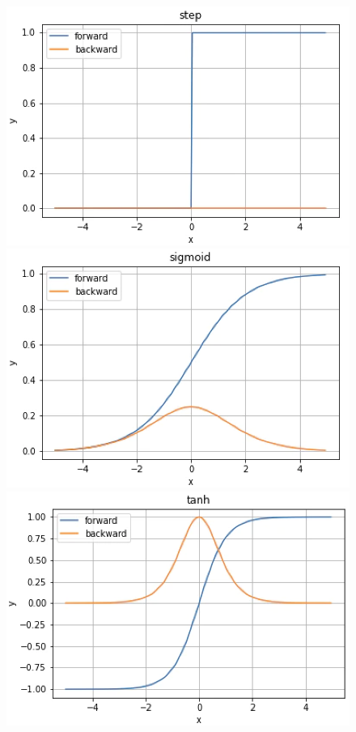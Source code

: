 \begin{figure}[H]
  \begin{minipage}[b]{0.45\linewidth}
    \centering
    \includegraphics[keepaspectratio, scale=0.25]{Figure/Deeplearning/step.png}
  \end{minipage}
    \begin{minipage}[b]{0.45\linewidth}
    \centering
    \includegraphics[keepaspectratio, scale=0.25]{Figure/Deeplearning/sigmoid.png}
  \end{minipage}
  \begin{minipage}[b]{0.45\linewidth}
    \centering
    \includegraphics[keepaspectratio, scale=0.25]{Figure/Deeplearning/tanh.png}

\end{minipage}
\end{figure}
